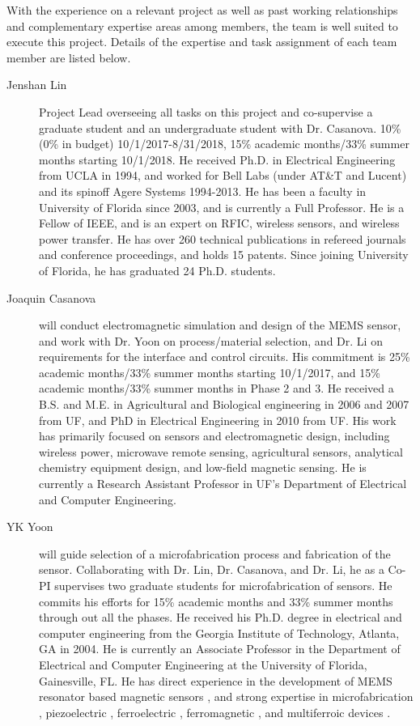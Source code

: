 With the experience on a relevant project as well as past working relationships and complementary expertise areas among members, the team is well suited to execute this project. Details of the expertise and task assignment of each team member are listed below. 

\begin{description}
  \item[Jenshan Lin] Project Lead overseeing all tasks on this project and co-supervise a graduate student and an undergraduate student with Dr. Casanova. 10\% (0\% in budget) 10/1/2017-8/31/2018, 15\% academic months/33\% summer months starting 10/1/2018. He received Ph.D. in Electrical Engineering from UCLA in 1994, and worked for Bell Labs (under AT\&T and Lucent) and its spinoff Agere Systems 1994-2013. He has been a faculty in University of Florida since 2003, and is currently a Full Professor. He is a Fellow of IEEE, and is an expert on RFIC, wireless sensors, and wireless power transfer. He has over 260 technical publications in refereed journals and conference proceedings, and holds 15 patents. Since joining University of Florida, he has graduated 24 Ph.D. students.
  \item[Joaquin Casanova] will conduct electromagnetic simulation and design of the MEMS sensor, and work with Dr. Yoon on process/material selection, and Dr. Li on requirements for the interface and control circuits. His commitment is 25\% academic months/33\% summer months starting 10/1/2017, and 15\% academic months/33\% summer months in Phase 2 and 3. He received a B.S. and M.E. in Agricultural and Biological engineering in 2006 and 2007 from UF, and PhD in Electrical Engineering in 2010 from UF. His work has primarily focused on sensors and electromagnetic design, including wireless power, microwave remote sensing, agricultural sensors, analytical chemistry equipment design, and low-field magnetic sensing. He is currently a Research Assistant Professor in UF's Department of Electrical and Computer Engineering. 
  \item[YK Yoon] will guide selection of a microfabrication process and fabrication of the sensor. Collaborating with Dr. Lin, Dr. Casanova, and Dr. Li, he as a Co-PI supervises two graduate students for microfabrication of sensors. He commits his efforts for 15\% academic months and 33\% summer months through out all the phases. He received his Ph.D. degree in electrical and computer engineering from the Georgia Institute of Technology, Atlanta, GA in 2004. He is currently an Associate Professor in the Department of Electrical and Computer Engineering at the University of Florida, Gainesville, FL. He has direct experience in the development of MEMS resonator based magnetic sensors \cite{choi2006magnetically, choi2006magnetically2, choi2011nonlinear}, and strong expertise in microfabrication \cite{yoon2006multidirectional}, piezoelectric \cite{wulateral}, ferroelectric \cite{kim2014microwave,yoon2005low,yoon2003reduced}, ferromagnetic \cite{rahimi2016study,rahimi2015cylindrical,yoon2013multi}, and multiferroic devices \cite{yoon2013multi,kim2014room}.


\end{description}

